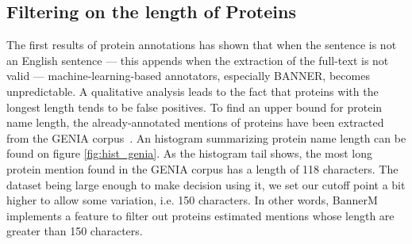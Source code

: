 \documentclass{report}
\begin{document}
                \subsection{Filtering on the length of Proteins}
                \label{sec:genia}
                The first results of protein annotations has shown that when 
                the sentence is not an English
                sentence --- this appends when the extraction of the full-text is 
                not valid --- machine-learning-based annotators,
                especially BANNER, becomes unpredictable. A qualitative analysis 
                leads to the fact that proteins with the longest
                length tends to be false positives. To find an upper bound for 
                protein name length, the already-annotated 
                mentions of proteins have been extracted from the GENIA 
                corpus~\cite{genia}. An histogram summarizing protein name length 
                can be found on figure \ref{fig:hist_genia}.  As the histogram 
                tail shows, the most 
                long protein mention found in the GENIA corpus has a length of 118 characters. The dataset being large enough to make decision
                using it, we set our cutoff point a bit higher to allow some
                variation, i.e. 150 characters. In other words, 
                BannerM implements a feature to filter out proteins estimated
                mentions whose length are greater than 150 characters.
                                               
\end{document}
